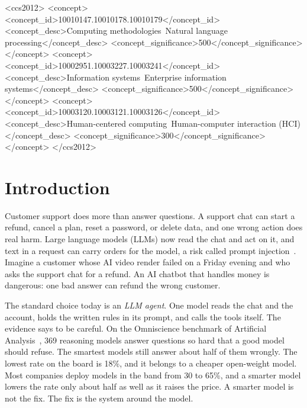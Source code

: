 \documentclass[sigconf,nonacm]{acmart}
\begin{document}
\begin{CCSXML}
<ccs2012>
   <concept>
       <concept_id>10010147.10010178.10010179</concept_id>
       <concept_desc>Computing methodologies~Natural language processing</concept_desc>
       <concept_significance>500</concept_significance>
   </concept>
   <concept>
       <concept_id>10002951.10003227.10003241</concept_id>
       <concept_desc>Information systems~Enterprise information systems</concept_desc>
       <concept_significance>500</concept_significance>
   </concept>
   <concept>
       <concept_id>10003120.10003121.10003126</concept_id>
       <concept_desc>Human-centered computing~Human-computer interaction (HCI)</concept_desc>
       <concept_significance>300</concept_significance>
   </concept>
</ccs2012>
\end{CCSXML}



\maketitle
\pagestyle{empty}
\thispagestyle{empty}

\section{Introduction}

Customer support does more than answer questions. A support chat can start a refund, cancel a plan, reset a password, or delete data, and one wrong action does real harm. Large language models (LLMs) now read the chat and act on it, and text in a request can carry orders for the model, a risk called prompt injection~\cite{greshake2023injection}. Imagine a customer whose AI video render failed on a Friday evening and who asks the support chat for a refund. An AI chatbot that handles money is dangerous: one bad answer can refund the wrong customer.

The standard choice today is an \emph{LLM agent}. One model reads the chat and the account, holds the written rules in its prompt, and calls the tools itself. The evidence says to be careful. On the Omniscience benchmark of Artificial Analysis~\cite{artificial2026omniscience}, 369 reasoning models answer questions so hard that a good model should refuse. The smartest models still answer about half of them wrongly. The lowest rate on the board is 18\%, and it belongs to a cheaper open-weight model. Most companies deploy models in the band from 30 to 65\%, and a smarter model lowers the rate only about half as well as it raises the price. A smarter model is not the fix. The fix is the system around the model.
\end{document}
